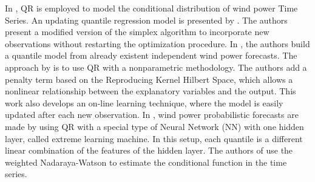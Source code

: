 %






In \cite{gallego2016line,moller_time-adaptive_2008,nielsen2006,bremnes_probabilistic_2004,wan_direct_2017}, QR is employed to model the conditional distribution of wind power Time Series.
An updating quantile regression model is presented by \cite{moller_time-adaptive_2008}. The authors present a modified version of the simplex algorithm to incorporate new observations without restarting the optimization procedure.
In \cite{nielsen2006}, the authors build a quantile model from already existent independent wind power forecasts.
The approach by \cite{gallego2016line} is to use QR with a nonparametric methodology. The authors add a penalty term based on the Reproducing Kernel Hilbert Space, which allows a nonlinear relationship between the explanatory variables and the output. This work also develops an on-line learning technique, where the model is easily updated after each new observation.
In \cite{wan_direct_2017}, wind power probabilistic forecasts are made by using QR with a special type of Neural Network (NN) with one hidden layer, called extreme learning machine. In this setup, each quantile is a different linear combination of the features of the hidden layer.
The authors of \cite{cai_regression_2002} use the weighted Nadaraya-Watson to estimate the conditional function in the time series.




